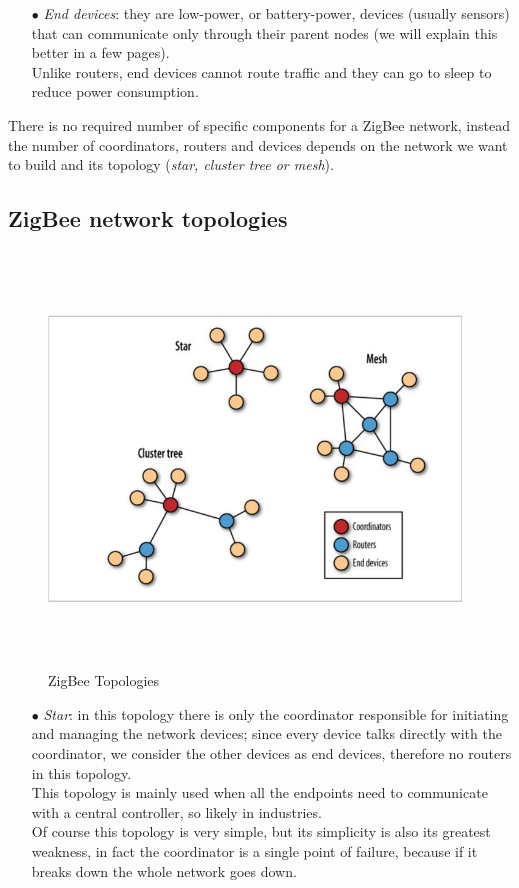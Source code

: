 \documentclass[12pt]{report}
\begin{document}
{{\begin{itemize}
\item[$\bullet$] \emph{End devices}: they are low-power, or battery-power, devices (usually sensors) that can communicate only through their parent nodes (we will explain this better in a few pages).\\
Unlike routers, end devices cannot route traffic and they can go to sleep to reduce power consumption.
\end{itemize}

There is no required number of specific components for a ZigBee network, instead the number of coordinators, routers and devices depends on the network we want to build and its topology (\emph{star, cluster tree or mesh}).

\subsection{ZigBee network topologies}

\begin{figure}[H]
\includegraphics[width=11cm,height=11cm,keepaspectratio]{zigbee_topologies}
\centering
\caption{ZigBee Topologies}
\end{figure}

\begin{itemize}
\setlength{\itemindent}{+4mm}
\item[$\bullet$] \emph{Star}: in this topology there is only the coordinator responsible for initiating and managing the network devices; since every device talks directly with the coordinator, we consider the other devices as end devices, therefore no routers in this topology.\\
This topology is mainly used when all the endpoints need to communicate with a central controller, so likely in industries.\\
Of course this topology is very simple, but its simplicity is also its greatest weakness, in fact the coordinator is a single point of failure, because if it breaks down the whole network goes down.


\end{itemize}}}
\end{document}
